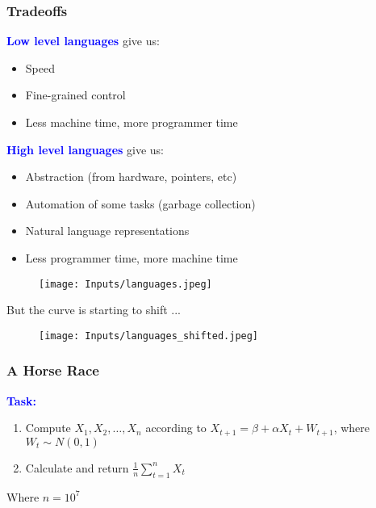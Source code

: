 \documentclass[
  xcolor={svgnames},
  hyperref={colorlinks,citecolor=DeepPink4,linkcolor=DarkRed,urlcolor=DarkBlue}
  ]{beamer}  %
\newcommand\boldblue[1]{\textcolor{blue}{\textbf{#1}}}
\begin{document}
\begin{frame}
  \frametitle{Tradeoffs}

  \boldblue{Low level languages} give us:
  \begin{itemize}
    \item Speed
    \item Fine-grained control
    \item Less machine time, more programmer time
  \end{itemize}

  \pause

  \vspace{1em}
  \boldblue{High level languages} give us:
  \begin{itemize}
    \item Abstraction (from hardware, pointers, etc)
    \item Automation of some tasks (garbage collection)
    \item Natural language representations
    \item Less programmer time, more machine time
  \end{itemize}

\end{frame}

\begin{frame}

  \begin{figure}
    \texttt{[image: Inputs/languages.jpeg]}
  \end{figure}

  But the curve is starting to shift ...
\end{frame}

\begin{frame}

  \begin{figure}
    \texttt{[image: Inputs/languages\_shifted.jpeg]}
  \end{figure}
\end{frame}

\begin{frame}
  \frametitle{A Horse Race}

  \boldblue{Task:}
  \vspace{1em}
  \begin{enumerate}
    \item Compute $X_1, X_2, \dots, X_n$ according to $X_{t+1} = \beta + \alpha X_{t} + W_{t+1}$, where $W_t \sim N(0,1)$
    \item Calculate and return $ \frac{1}{n} \sum_{t=1}^n X_t $
  \end{enumerate}

  \vspace{1em}
  Where $n = 10^7$

\end{frame}
\end{document}
